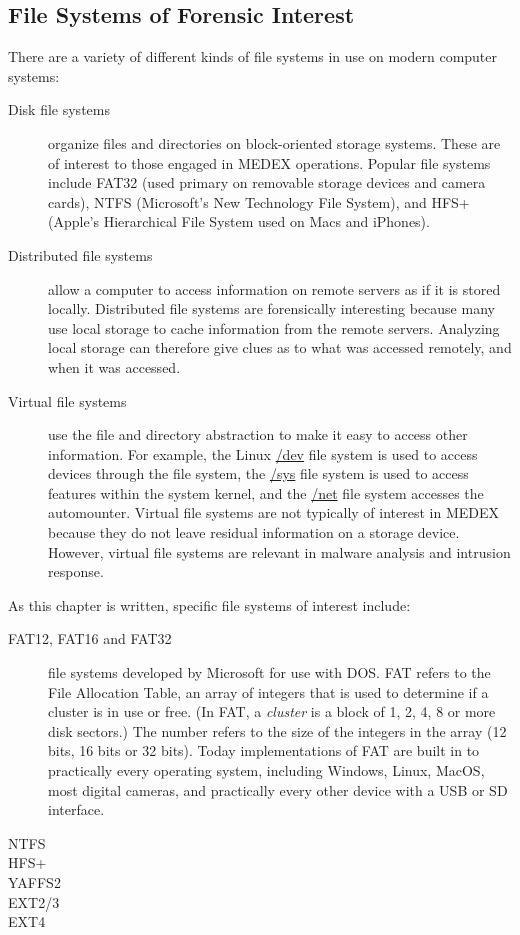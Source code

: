 \documentclass[11pt,letter]{article}
\begin{document}
\subsection{File Systems of Forensic Interest}
There are a variety of different kinds of file systems in use on
modern computer systems:
\begin{description}
\item[Disk file systems] organize files and directories on
  block-oriented storage systems. These are of interest to those
  engaged in MEDEX operations. Popular file systems include FAT32
  (used primary on removable storage devices and camera cards), NTFS
  (Microsoft's New Technology File System), and HFS+ (Apple's
  Hierarchical File System used on Macs and iPhones).
\item[Distributed file systems] allow a computer to access
  information on remote servers as if it is stored
  locally. Distributed file systems are forensically interesting
  because many use local storage to cache information from the remote
  servers. Analyzing local storage can therefore give clues as to what
  was accessed remotely, and when it was accessed.
\item[Virtual file systems] use the file and directory abstraction to
  make it easy to access other information. For example, the Linux
  \url{/dev} file system is used to access devices through the file
  system, the \url{/sys} file system is used to access features within
  the system kernel, and the \url{/net} file system accesses the
  automounter. Virtual file systems are not typically of interest in
  MEDEX because they do not leave residual information on a storage
  device. However, virtual file systems are relevant in malware
  analysis and intrusion response.
\end{description}

As this chapter is written, specific file systems of interest include:
\begin{description}
\item[FAT12, FAT16 and FAT32] file systems developed by Microsoft for use with
  DOS. FAT refers to the File Allocation Table, an array of integers
  that is used to determine if a cluster is in use or free. (In FAT, a
  \emph{cluster} is a block of 1, 2, 4, 8 or more disk sectors.) The number
  refers to the size of the integers in the array (12 bits, 16 bits or
  32 bits). Today implementations of FAT are built in to practically every
  operating system, including Windows, Linux, MacOS, most digital
  cameras, and practically every other device with a USB or SD
  interface. 
\item[NTFS] 
\item[HFS+]
\item[YAFFS2]
\item[EXT2/3]
\item[EXT4]
\end{description}
\end{document}
